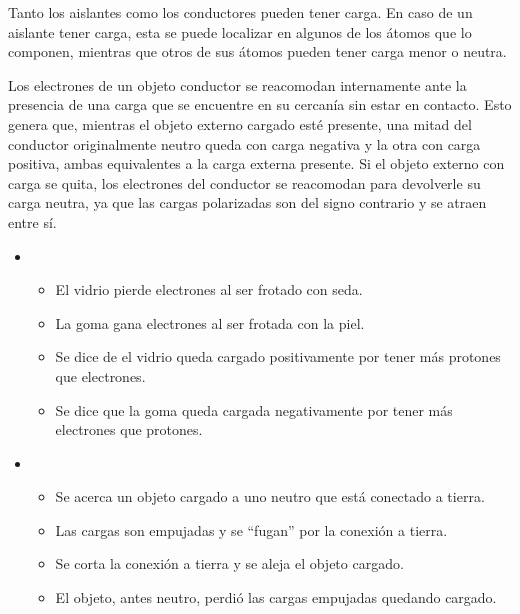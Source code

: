 \documentclass[a5paper,12pt,twoside]{book}
\begin{document}
Tanto los aislantes como los conductores pueden tener carga.
En caso de un aislante tener carga, esta se puede localizar en algunos de los átomos que lo componen, mientras que otros de sus átomos pueden tener carga menor o neutra.


Los electrones de un objeto conductor se reacomodan internamente ante la presencia de una carga que se encuentre en su cercanía sin estar en contacto.
Esto genera que, mientras el objeto externo cargado esté presente, una mitad del conductor originalmente neutro queda con carga negativa y la otra con carga positiva, ambas equivalentes a la carga externa presente.
Si el objeto externo con carga se quita, los electrones del conductor se reacomodan para devolverle su carga neutra, ya que las cargas polarizadas son del signo contrario y se atraen entre sí.

\begin{itemize}
    \item {}
    
    \begin{itemize}
        \item El vidrio pierde electrones al ser frotado con seda.
        \item La goma gana electrones al ser frotada con la piel.
        \item Se dice de el vidrio queda cargado positivamente por tener más protones que electrones.
        \item Se dice que la goma queda cargada negativamente por tener más electrones que protones.
    \end{itemize}

    \item {}
    
    \begin{itemize}
        \item Se acerca un objeto cargado a uno neutro que está conectado a tierra.
        \item Las cargas son empujadas y se ``fugan'' por la conexión a tierra.
        \item Se corta la conexión a tierra y se aleja el objeto cargado.
        \item El objeto, antes neutro, perdió las cargas empujadas quedando cargado.
    \end{itemize}

    \begin{center}
        \def\svgwidth{\linewidth}
        
    \end{center}
\end{itemize}
\end{document}
